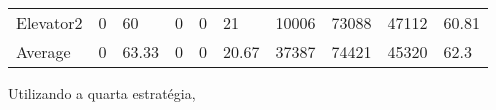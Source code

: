 ﻿\documentclass[a4paper]{article}
\begin{document}
\begin{table}[h]
\begin{tabular}{@{}llllllllll@{}}
Elevator2 & 0        & 60            & 0           & 0                                                               & 21                                                                  & 10006                                                         & 73088                                                 & 47112                                                   & 60.81         \\
Average   & 0     & 63.33         & 0        & 0                                                               & 20.67                                                               & 37387                                                         & 74421                                                 &  45320                                                  & 62.3         \\ \bottomrule
\end{tabular}
\end{table}

Utilizando a quarta estratégia,
\end{document}
